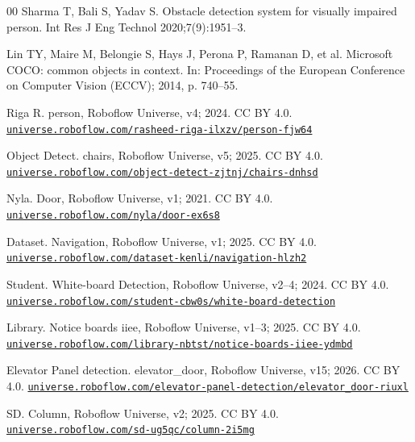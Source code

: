 \documentclass[3p,times,procedia]{elsarticle}
\begin{document}
\begin{thebibliography}{00}
Sharma T, Bali S, Yadav S. Obstacle detection system for visually impaired
person. Int Res J Eng Technol 2020;7(9):1951--3.

Lin TY, Maire M, Belongie S, Hays J, Perona P, Ramanan D, et al. Microsoft
COCO: common objects in context. In: Proceedings of the European Conference
on Computer Vision (ECCV); 2014, p. 740--55.

Riga R. person, Roboflow Universe, v4; 2024. CC BY 4.0. \href{https://universe.roboflow.com/rasheed-riga-ilxzv/person-fjw64}{\nolinkurl{universe.roboflow.com/rasheed-riga-ilxzv/person-fjw64}}

Object Detect. chairs, Roboflow Universe, v5; 2025. CC BY 4.0. \href{https://universe.roboflow.com/object-detect-zjtnj/chairs-dnhsd}{\nolinkurl{universe.roboflow.com/object-detect-zjtnj/chairs-dnhsd}}

Nyla. Door, Roboflow Universe, v1; 2021. CC BY 4.0. \href{https://universe.roboflow.com/nyla/door-ex6s8}{\nolinkurl{universe.roboflow.com/nyla/door-ex6s8}}

Dataset. Navigation, Roboflow Universe, v1; 2025. CC BY 4.0. \href{https://universe.roboflow.com/dataset-kenli/navigation-hlzh2}{\nolinkurl{universe.roboflow.com/dataset-kenli/navigation-hlzh2}}

Student. White-board Detection, Roboflow Universe, v2--4; 2024. CC BY 4.0. \href{https://universe.roboflow.com/student-cbw0s/white-board-detection}{\nolinkurl{universe.roboflow.com/student-cbw0s/white-board-detection}}

Library. Notice boards iiee, Roboflow Universe, v1--3; 2025. CC BY 4.0. \href{https://universe.roboflow.com/library-nbtst/notice-boards-iiee-ydmbd}{\nolinkurl{universe.roboflow.com/library-nbtst/notice-boards-iiee-ydmbd}}

Elevator Panel detection. elevator\_door, Roboflow Universe, v15; 2026. CC BY 4.0. \href{https://universe.roboflow.com/elevator-panel-detection/elevator_door-riuxl}{\nolinkurl{universe.roboflow.com/elevator-panel-detection/elevator_door-riuxl}}

SD. Column, Roboflow Universe, v2; 2025. CC BY 4.0. \href{https://universe.roboflow.com/sd-ug5qc/column-2i5mg}{\nolinkurl{universe.roboflow.com/sd-ug5qc/column-2i5mg}}


\end{thebibliography}
\end{document}
